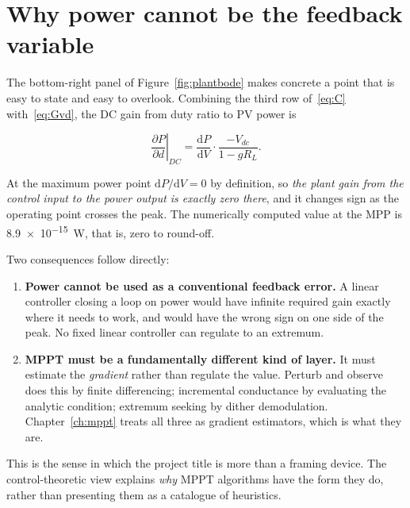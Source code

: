 \section{Why power cannot be the feedback variable}
\label{sec:vanishing}

The bottom-right panel of Figure~\ref{fig:plantbode} makes concrete a point that
is easy to state and easy to overlook. Combining the third row of~\eqref{eq:C}
with~\eqref{eq:Gvd}, the DC gain from duty ratio to PV power is

\begin{equation}
\left.\frac{\partial P}{\partial d}\right|_{DC}
= \frac{\mathrm{d}P}{\mathrm{d}V}\cdot \frac{-V_{dc}}{1 - g R_L} .
\label{eq:powergain}
\end{equation}

At the maximum power point $\mathrm{d}P/\mathrm{d}V = 0$ by definition, so
\emph{the plant gain from the control input to the power output is exactly
zero there}, and it changes sign as the operating point crosses the peak. The
numerically computed value at the MPP is \SI{8.9e-15}{\watt}, that is, zero to
round-off.

Two consequences follow directly:

\begin{enumerate}[leftmargin=1.6em]
  \item \textbf{Power cannot be used as a conventional feedback error.} A linear
        controller closing a loop on power would have infinite required gain
        exactly where it needs to work, and would have the wrong sign on one
        side of the peak. No fixed linear controller can regulate to an
        extremum.
  \item \textbf{MPPT must be a fundamentally different kind of layer.} It must
        estimate the \emph{gradient} rather than regulate the value. Perturb and
        observe does this by finite differencing; incremental conductance by
        evaluating the analytic condition; extremum seeking by dither
        demodulation. Chapter~\ref{ch:mppt} treats all three as gradient
        estimators, which is what they are.
\end{enumerate}

This is the sense in which the project title is more than a framing device. The
control-theoretic view explains \emph{why} MPPT algorithms have the form they
do, rather than presenting them as a catalogue of heuristics.
